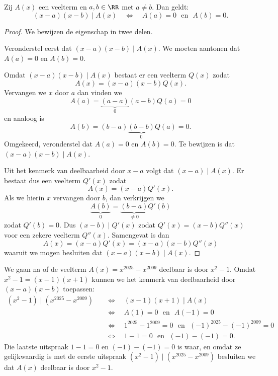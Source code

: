 \documentclass{ximera}
\begin{document}
\begin{stelling} 
Zij $A(x)$ een veelterm en $a,b \in \RR$ met $a \neq b$. Dan geldt:
\[
(x-a)(x-b) \mid A(x) \quad \Leftrightarrow \quad A(a) = 0 \,\, \text{ en } \,\, A(b) = 0.
\]
\end{stelling}
\begin{Uitbreiding}
\begin{proof}
We bewijzen de eigenschap in twee delen.

Veronderstel eerst dat $(x-a)(x-b) \mid A(x)$. We moeten aantonen dat $A(a) = 0$ en $A(b) = 0$.

Omdat $(x-a)(x-b) \mid A(x)$ bestaat er een veelterm $Q(x)$ zodat
\[
A(x) = (x-a)(x-b)Q(x).
\]
Vervangen we $x$ door $a$ dan vinden we 
\[
A(a) = \underbrace{(a-a)}_{0}(a-b)Q(a) = 0
\]
en analoog is
\[
A(b) = (b-a)\underbrace{(b-b)}_{0}Q(a) = 0.
\]
Omgekeerd, veronderstel dat $A(a) = 0$ en $A(b) = 0$. Te bewijzen is dat $(x-a)(x-b) \mid A(x)$.

Uit het kenmerk van deelbaarheid door $x-a$ volgt dat $(x-a) \mid A(x)$. Er bestaat dus een veelterm $Q'(x)$ zodat
\[
A(x) = (x-a)Q'(x).
\]
Als we hierin $x$ vervangen door $b$, dan verkrijgen we 
\[
\underbrace{A(b)}_{0} = \underbrace{(b - a)}_{\neq 0} Q'(b)
\]
zodat $Q'(b) = 0$. Dus $(x-b) \mid Q'(x)$ zodat $Q'(x) = (x-b)Q''(x)$ voor een zekere veelterm $Q''(x)$. Samengevat is dan
\[
A(x) = (x-a)Q'(x) = (x-a)(x-b)Q''(x)
\]
waaruit we mogen besluiten dat $(x-a)(x-b) \mid A(x)$.
\end{proof}
\end{Uitbreiding}

\begin{example}
We gaan na of de veelterm $A(x) = x^{2025} - x^{2009}$ deelbaar is door $x^2 - 1$. Omdat $x^2-1 = (x-1)(x+1)$ kunnen we het kenmerk van deelbaarheid door $(x-a)(x-b)$ toepassen:
\begin{align*}
(x^2-1) \mid (x^{2025} - x^{2009}) \quad 
& \Leftrightarrow \quad (x-1)(x+1) \mid A(x) \\
& \Leftrightarrow \quad A(1) = 0 \,\, \text{ en } \,\, A(-1) = 0 \\
& \Leftrightarrow \quad 1^{2025} - 1^{2009} = 0 \,\, \text{ en } \,\, (-1)^{2025} - (-1)^{2009} = 0 \\
& \Leftrightarrow \quad 1 - 1 = 0 \,\, \text{ en } \,\, (-1) - (-1) = 0.
\end{align*}
Die laatste uitspraak $1 - 1 = 0$ en $(-1) - (-1) = 0$ is waar, en omdat ze gelijkwaardig is met de eerste uitspraak $(x^2-1) \mid (x^{2025} - x^{2009})$ besluiten we dat $A(x)$ deelbaar is door $x^2-1$. 
\end{example}
\end{document}
